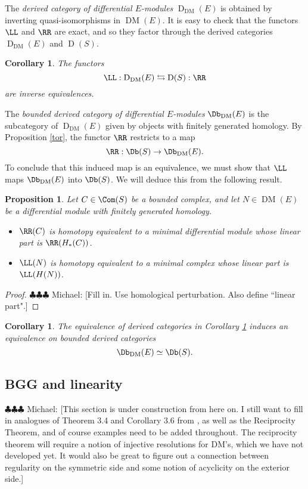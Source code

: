 \documentclass[12pt]{amsart}
\newtheorem{prop}[lemma]{Proposition}
\newtheorem{cor}[lemma]{Corollary}
\theoremstyle{definition}
\theoremstyle{remark}
\newcommand{\michael}[1]{{\color{red} \sf $\clubsuit\clubsuit\clubsuit$ Michael: [#1]}}
\def\on{\operatorname}
\def\DM{\operatorname{DM}}
\begin{document}
The \emph{derived category of differential $E$-modules} $\on{D}_{\DM}(E)$ is obtained by inverting quasi-isomorphisms in $\DM(E)$. It is easy to check that the functors $\LL$ and $\RR$ are exact, and so they factor through the derived categories $\on{D}_{\DM}(E)$ and $\on{D}(S)$. 
\begin{cor} 
\label{derived}
The functors
$$
\LL : \on{D}_{\DM}(E) \leftrightarrows \on{D}(S) : \RR
$$
are inverse equivalences.
\end{cor}

The \emph{bounded derived category of differential $E$-modules} $\Db_{\DM}(E)$ is the subcategory of $\on{D}_{\DM}(E)$ given by objects with finitely generated homology. By Proposition \ref{tor}, the functor $\RR$ restricts to a map
$$
\RR : \Db(S) \to \Db_{\DM}(E).
$$
To conclude that this induced map is an equivalence, we must show that $\LL$ maps $\Db_{\DM}(E)$ into $\Db(S)$. We will deduce this from the following result.

\begin{prop}
Let $C \in \Com(S)$ be a bounded complex, and let $N \in \DM(E)$ be a differential module with finitely generated homology.
\begin{itemize}
\item[(a)] $\RR(C)$ is homotopy equivalent to a minimal differential module whose linear part  is $\RR(H_*(C))$.
\item[(b)] $\LL(N)$ is homotopy equivalent to a minimal complex whose linear part is $\LL(H(N))$.
\end{itemize}
\end{prop}

\begin{proof}
\michael{Fill in. Use homological perturbation. Also define ``linear part".}
\end{proof}

\begin{cor}
\label{bounded}
The equivalence of derived categories in Corollary \ref{derived} induces an equivalence on bounded derived categories
$$
 \Db_{\DM}(E)\simeq \Db(S).
$$
\end{cor}


\subsection{BGG and linearity}

\michael{This section is under construction from here on. I still want to fill in analogues of Theorem 3.4 and Corollary 3.6 from \cite{EFS}, as well as the Reciprocity Theorem, and of course examples need to be added throughout. The reciprocity theorem will require a notion of injective resolutions for DM's, which we have not developed yet. It would also be great to figure out a connection between regularity on the symmetric side and some notion of acyclicity on the exterior side.}
\end{document}
